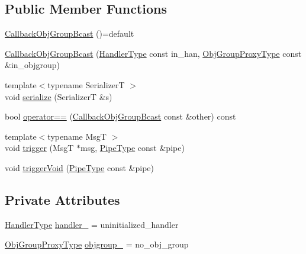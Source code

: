 \subsection*{Public Member Functions}
\begin{DoxyCompactItemize}
\item 
\hyperlink{structvt_1_1pipe_1_1callback_1_1_callback_obj_group_bcast_a8561b655015ff3b5babf80e95f224727}{Callback\+Obj\+Group\+Bcast} ()=default
\item 
\hyperlink{structvt_1_1pipe_1_1callback_1_1_callback_obj_group_bcast_ae7943e2d45503a44de66ec6f6e298cd5}{Callback\+Obj\+Group\+Bcast} (\hyperlink{namespacevt_af64846b57dfcaf104da3ef6967917573}{Handler\+Type} const in\+\_\+han, \hyperlink{namespacevt_ad7cae989df485fccca57f0792a880a8e}{Obj\+Group\+Proxy\+Type} const \&in\+\_\+objgroup)
\item 
{\footnotesize template$<$typename SerializerT $>$ }\\void \hyperlink{structvt_1_1pipe_1_1callback_1_1_callback_obj_group_bcast_aa54227732bb00239a126c34c78aba5fb}{serialize} (SerializerT \&s)
\item 
bool \hyperlink{structvt_1_1pipe_1_1callback_1_1_callback_obj_group_bcast_a45c2e760843a416992e2a85c265136c7}{operator==} (\hyperlink{structvt_1_1pipe_1_1callback_1_1_callback_obj_group_bcast}{Callback\+Obj\+Group\+Bcast} const \&other) const
\item 
{\footnotesize template$<$typename MsgT $>$ }\\void \hyperlink{structvt_1_1pipe_1_1callback_1_1_callback_obj_group_bcast_aa39774bf2c1e2eeebf19339ad06253c8}{trigger} (MsgT $\ast$msg, \hyperlink{namespacevt_ac9852acda74d1896f48f406cd72c7bd3}{Pipe\+Type} const \&pipe)
\item 
void \hyperlink{structvt_1_1pipe_1_1callback_1_1_callback_obj_group_bcast_ab1a7563aa18693946506a66506f94671}{trigger\+Void} (\hyperlink{namespacevt_ac9852acda74d1896f48f406cd72c7bd3}{Pipe\+Type} const \&pipe)
\end{DoxyCompactItemize}
\subsection*{Private Attributes}
\begin{DoxyCompactItemize}
\item 
\hyperlink{namespacevt_af64846b57dfcaf104da3ef6967917573}{Handler\+Type} \hyperlink{structvt_1_1pipe_1_1callback_1_1_callback_obj_group_bcast_aff3713d579f1311e327ec933ec0463a9}{handler\+\_\+} = uninitialized\+\_\+handler
\item 
\hyperlink{namespacevt_ad7cae989df485fccca57f0792a880a8e}{Obj\+Group\+Proxy\+Type} \hyperlink{structvt_1_1pipe_1_1callback_1_1_callback_obj_group_bcast_a69a866eae9abf12ca0b60c9158c82a20}{objgroup\+\_\+} = no\+\_\+obj\+\_\+group
\end{DoxyCompactItemize}



